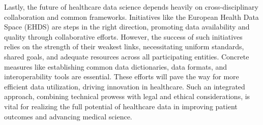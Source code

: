 Lastly, the future of healthcare data science depends heavily on cross-disciplinary collaboration and common frameworks. Initiatives like the European Health Data Space (EHDS) are steps in the right direction, promoting data availability and quality through collaborative efforts. However, the success of such initiatives relies on the strength of their weakest links, necessitating uniform standards, shared goals, and adequate resources across all participating entities. Concrete measures like establishing common data dictionaries, data formats, and interoperability tools are essential. These efforts will pave the way for more efficient data utilization, driving innovation in healthcare. Such an integrated approach, combining technical prowess with legal and ethical considerations, is vital for realizing the full potential of healthcare data in improving patient outcomes and advancing medical science.